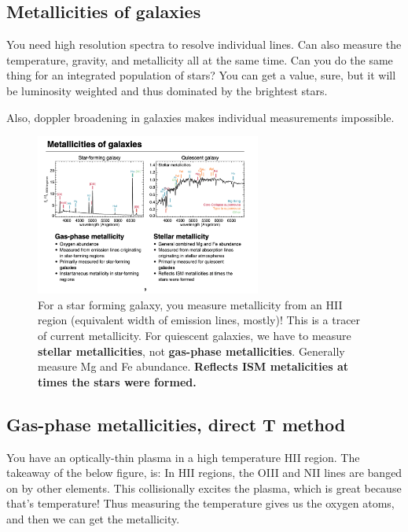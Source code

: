 \documentclass{article}
\begin{document}
\subsection{Metallicities of galaxies}

You need high resolution spectra to resolve individual lines. Can also measure the temperature, gravity, and metallicity all at the same time. Can you do the same thing for an integrated population of stars? You can get a value, sure, but it will be luminosity weighted and thus dominated by the brightest stars.

Also, doppler broadening in galaxies makes individual measurements impossible. 

\begin{figure}
    \centering
    \includegraphics[width=0.66\textwidth]{figs/Screen Shot 2021-10-06 at 10.30.19 AM.png}
    \caption{For a star forming galaxy, you measure metallicity from an HII region (equivalent width of emission lines, mostly)! This is a tracer of current metallicity. For quiescent galaxies, we have to measure \textbf{stellar metallicities}, not \textbf{gas-phase metallicities}. Generally measure Mg and Fe abundance. \textbf{Reflects ISM metalicities at times the stars were formed. }}
    \label{fig:metallicities_of_galaxies}
\end{figure}

\subsection{Gas-phase metallicities, direct T method}

You have an optically-thin plasma in a high temperature HII region. The takeaway of the below figure, is: In HII regions, the OIII and NII lines are banged on by other elements. This collisionally excites the plasma, which is great because that's temperature! Thus measuring the temperature gives us the oxygen atoms, and then we can get the metallicity.
\end{document}
